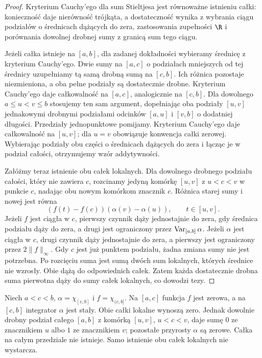 \begin{proof}
Kryterium Cauchy'ego dla sum Stieltjesa jest równoważne istnieniu całki: konieczność daje nierówność trójkąta, a dostateczność wynika z wybrania ciągu podziałów o średnicach dążących do zera, zastosowania zupełności $\R$ i porównania dowolnej drobnej sumy z granicą sum tego ciągu.

Jeżeli całka istnieje na $[a,b]$, dla zadanej dokładności wybieramy średnicę z kryterium Cauchy'ego. Dwie sumy na $[a,c]$ o podziałach mniejszych od tej średnicy uzupełniamy tą samą drobną sumą na $[c,b]$. Ich różnica pozostaje niezmieniona, a oba pełne podziały są dostatecznie drobne. Kryterium Cauchy'ego daje całkowalność na $[a,c]$, analogicznie na $[c,b]$. Dla dowolnego $a\le u<v\le b$ stosujemy
ten sam argument, dopełniając oba podziały $[u,v]$
jednakowymi drobnymi podziałami odcinków $[a,u]$
i $[v,b]$ o dodatniej długości. Przedziały
jednopunktowe pomijamy. Kryterium Cauchy'ego
daje całkowalność na $[u,v]$; dla $u=v$
obowiązuje konwencja całki zerowej. Wybierając podziały obu części o średnicach dążących do zera i łącząc je w podział całości, otrzymujemy wzór addytywności.

Załóżmy teraz istnienie obu całek lokalnych. Dla dowolnego drobnego podziału całości, który nie zawiera $c$, rozcinamy jedyną komórkę $[u,v]$ z $u<c<v$ w punkcie $c$, nadając obu nowym komórkom znacznik $c$. Różnica starej sumy i nowej jest równa
\[
 (f(t)-f(c))(\alpha(v)-\alpha(u)),
 \qquad t\in[u,v].
\]
Jeżeli $f$ jest ciągła w $c$, pierwszy czynnik dąży jednostajnie do zera, gdy średnica podziału dąży do zera, a drugi jest ograniczony przez $\operatorname{Var}_{[a,b]}\alpha$. Jeżeli $\alpha$ jest ciągła w $c$, drugi czynnik dąży jednostajnie do zera, a pierwszy jest ograniczony przez $2\|f\|_\infty$. Gdy $c$ jest już punktem podziału, żadna zmiana sumy nie jest potrzebna. Po rozcięciu suma jest sumą dwóch sum lokalnych, których średnice nie wzrosły. Obie dążą do odpowiednich całek. Zatem każda dostatecznie drobna suma pierwotna dąży do sumy całek lokalnych, co dowodzi tezy.
\end{proof}
\begin{przyklad}\label{it:ex:rs-gluing-failure}
Niech $a<c<b$, $\alpha=\chi_{[c,b]}$ i $f=\chi_{(c,b]}$. Na $[a,c]$ funkcja $f$ jest zerowa, a na $[c,b]$ integrator $\alpha$ jest stały. Obie całki lokalne wynoszą zero. Jednak dowolnie drobny podział całego $[a,b]$ z komórką $[u,v]$, $u<c<v$, daje sumę $0$ ze znacznikiem $u$ albo $1$ ze znacznikiem $v$; pozostałe przyrosty $\alpha$ są zerowe. Całka na całym przedziale nie istnieje. Samo istnienie obu całek lokalnych nie wystarcza.
\end{przyklad}

